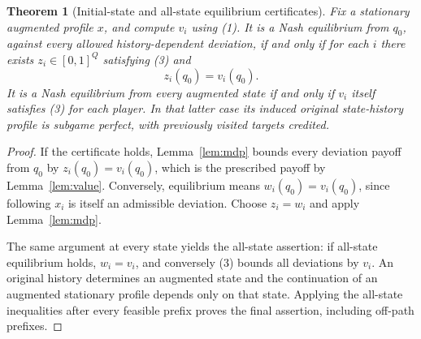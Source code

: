 \documentclass[11pt]{article}
\newtheorem{theorem}{Theorem}
\theoremstyle{remark}\newtheorem{remark}[theorem]{Remark}
\begin{document}
\begin{theorem}[Initial-state and all-state equilibrium certificates]\label{thm:cert}
Fix a stationary augmented profile $x$, and compute $v_i$ using (1). It is a Nash equilibrium from $q_0$, against every allowed history-dependent deviation, if and only if for each $i$ there exists $z_i\in[0,1]^Q$ satisfying (3) and
\[
 z_i(q_0)=v_i(q_0).                                               \tag{4}
\]
It is a Nash equilibrium from every augmented state if and only if $v_i$ itself satisfies (3) for each player. In that latter case its induced original state-history profile is subgame perfect, with previously visited targets credited.
\end{theorem}
\begin{proof}
If the certificate holds, Lemma~\ref{lem:mdp} bounds every deviation payoff from $q_0$ by $z_i(q_0)=v_i(q_0)$, which is the prescribed payoff by Lemma~\ref{lem:value}. Conversely, equilibrium means $w_i(q_0)=v_i(q_0)$, since following $x_i$ is itself an admissible deviation. Choose $z_i=w_i$ and apply Lemma~\ref{lem:mdp}.

The same argument at every state yields the all-state assertion: if all-state equilibrium holds, $w_i=v_i$, and conversely (3) bounds all deviations by $v_i$. An original history determines an augmented state and the continuation of an augmented stationary profile depends only on that state. Applying the all-state inequalities after every feasible prefix proves the final assertion, including off-path prefixes.
\end{proof}
\end{document}
